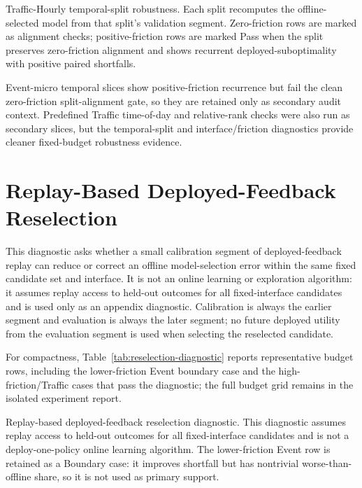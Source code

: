 \documentclass{article}
\begin{document}
\begin{table}[!htbp]
\centering
\scriptsize
\setlength{\tabcolsep}{2.5pt}
\begin{adjustbox}{width=\appwidetablewidth}

\end{adjustbox}
\caption{Traffic-Hourly temporal-split robustness. Each split recomputes the offline-selected model from that split's validation segment. Zero-friction rows are marked as alignment checks; positive-friction rows are marked Pass when the split preserves zero-friction alignment and shows recurrent deployed-suboptimality with positive paired shortfalls.}
\label{tab:traffic-temporal-splits}
\end{table}

Event-micro temporal slices show positive-friction recurrence but fail the clean zero-friction split-alignment gate, so they are retained only as secondary audit context. Predefined Traffic time-of-day and relative-rank checks were also run as secondary slices, but the temporal-split and interface/friction diagnostics provide cleaner fixed-budget robustness evidence.

\FloatBarrier

\section{Replay-Based Deployed-Feedback Reselection}
\label{app:reselection-diagnostic}

This diagnostic asks whether a small calibration segment of deployed-feedback replay can reduce or correct an offline model-selection error within the same fixed candidate set and interface. It is not an online learning or exploration algorithm: it assumes replay access to held-out outcomes for all fixed-interface candidates and is used only as an appendix diagnostic. Calibration is always the earlier segment and evaluation is always the later segment; no future deployed utility from the evaluation segment is used when selecting the reselected candidate.

For compactness, Table~\ref{tab:reselection-diagnostic} reports representative budget rows, including the lower-friction Event boundary case and the high-friction/Traffic cases that pass the diagnostic; the full budget grid remains in the isolated experiment report.

\begin{table}[!htbp]
\centering
\begin{minipage}{\appmidtablewidth}
\centering
\scriptsize
\setlength{\tabcolsep}{2.5pt}
\begin{adjustbox}{width=\linewidth}

\end{adjustbox}
\caption{Replay-based deployed-feedback reselection diagnostic. This diagnostic assumes replay access to held-out outcomes for all fixed-interface candidates and is not a deploy-one-policy online learning algorithm. The lower-friction Event row is retained as a Boundary case: it improves shortfall but has nontrivial worse-than-offline share, so it is not used as primary support.}
\label{tab:reselection-diagnostic}
\end{minipage}
\end{table}
\end{document}
